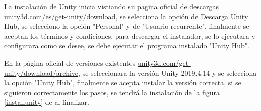 La instalación de Unity inicia vistiando su pagina oficial de descargas  \href{https://unity3d.com/es/get-unity/download}{unity3d.com/es/get-unity/download}, se selecciona la opción de Descarga Unity Hub, se selecciono la opción "Personal" y de "Usuario recurrente", finalmente se aceptan los términos y condiciones, para descargar el instalador, se lo ejecutara y configurara como se desee, se debe ejecutar el programa instalado "Unity Hub".  

En la página oficial de versiones existentes \href{https://unity3d.com/get-unity/download/archive}{unity3d.com/get-unity/download/archive}, se seleccionara la versión Unity 2019.4.14 y se selecciona la opción "Unity Hub", finalmente se acepta instalar la versión correcta, si se siguieron correctamente los pasos, se tendrá la instalación de la figura \ref{installunity} de  al finalizar.

